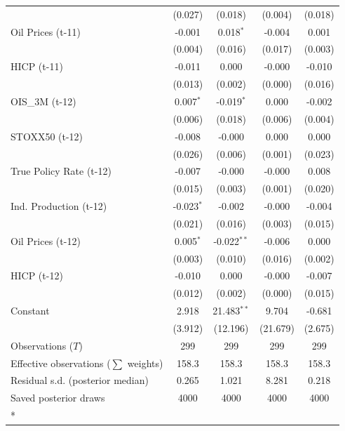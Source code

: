 \begin{longtable}[t]{lcccc}
 & (0.027) & (0.018) & (0.004) & (0.018)\\
Oil Prices (t-11) & -0.001 & 0.018$^{*}$ & -0.004 & 0.001\\
 & (0.004) & (0.016) & (0.017) & (0.003)\\
HICP (t-11) & -0.011 & 0.000 & -0.000 & -0.010\\
 & (0.013) & (0.002) & (0.000) & (0.016)\\
OIS\_3M (t-12) & 0.007$^{*}$ & -0.019$^{*}$ & 0.000 & -0.002\\
 & (0.006) & (0.018) & (0.006) & (0.004)\\
STOXX50 (t-12) & -0.008 & -0.000 & 0.000 & 0.000\\
 & (0.026) & (0.006) & (0.001) & (0.023)\\
True Policy Rate (t-12) & -0.007 & -0.000 & -0.000 & 0.008\\
 & (0.015) & (0.003) & (0.001) & (0.020)\\
Ind. Production (t-12) & -0.023$^{*}$ & -0.002 & -0.000 & -0.004\\
 & (0.021) & (0.016) & (0.003) & (0.015)\\
Oil Prices (t-12) & 0.005$^{*}$ & -0.022$^{**}$ & -0.006 & 0.000\\
 & (0.003) & (0.010) & (0.016) & (0.002)\\
HICP (t-12) & -0.010 & 0.000 & -0.000 & -0.007\\
 & (0.012) & (0.002) & (0.000) & (0.015)\\
Constant & 2.918 & 21.483$^{**}$ & 9.704 & -0.681\\
 & (3.912) & (12.196) & (21.679) & (2.675)\\
\midrule
Observations ($T$) & 299 & 299 & 299 & 299\\
Effective observations ($\sum$ weights) & 158.3 & 158.3 & 158.3 & 158.3\\
Residual s.d. (posterior median) & 0.265 & 1.021 & 8.281 & 0.218\\
Saved posterior draws & 4000 & 4000 & 4000 & 4000\\*
\end{longtable}
\endgroup{}

